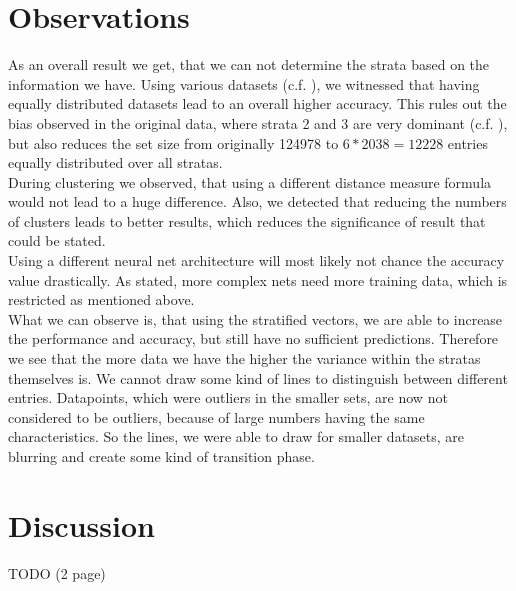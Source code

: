 \documentclass[runningheads]{llncs}
\begin{document}
	\section{Observations}
	As an overall result we get, that we can not determine the strata based on the information we have.
	Using various datasets (c.f. ), we witnessed that having equally distributed datasets lead to an overall higher accuracy. This rules out the bias observed in the original data, where strata 2 and 3 are very dominant (c.f. ), but also reduces the set size from originally 124978 to $6*2038=12228$ entries equally distributed over all stratas.\\
	During clustering we observed, that using a different distance measure formula would not lead to a huge difference. Also, we detected that reducing the numbers of clusters leads to better results, which reduces the significance of result that could be stated.\\
	Using a different neural net architecture will most likely not chance the accuracy value drastically. As stated, more complex nets need more training data, which is restricted as mentioned above.\\
	What we can observe is, that using the stratified vectors, we are able to increase the performance and accuracy, but still have no sufficient predictions. Therefore we see that the more data we have the higher the variance within the stratas themselves is. We cannot draw some kind of lines to distinguish between different entries. Datapoints, which were outliers in the smaller sets, are now not considered to be outliers, because of large numbers having the same characteristics. So the lines, we were able to draw for smaller datasets, are blurring and create some kind of transition phase.\\ %
	

	\section{Discussion}
	TODO (2 page)
\end{document}
